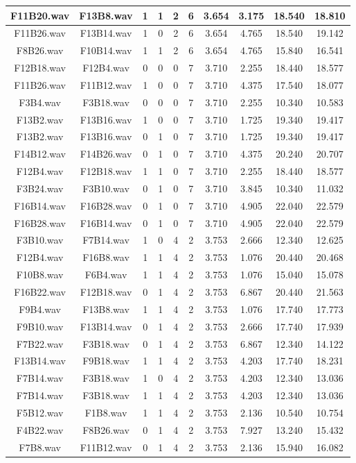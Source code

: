 \documentclass[11pt,a4paper]{book}
\begin{document}
\begin{longtable}[c]{|c|c|c|c|c|c|c|c|c|c|}
F11B20.wav&F13B8.wav&1&1&2&6&3.654&3.175&18.540&18.810\\ \hline
F11B26.wav&F13B14.wav&1&0&2&6&3.654&4.765&18.540&19.142\\ \hline
F8B26.wav&F10B14.wav&1&1&2&6&3.654&4.765&15.840&16.541\\ \hline
F12B18.wav&F12B4.wav&0&0&0&7&3.710&2.255&18.440&18.577\\ \hline
F11B26.wav&F11B12.wav&1&0&0&7&3.710&4.375&17.540&18.077\\ \hline
F3B4.wav&F3B18.wav&0&0&0&7&3.710&2.255&10.340&10.583\\ \hline
F13B2.wav&F13B16.wav&1&0&0&7&3.710&1.725&19.340&19.417\\ \hline
F13B2.wav&F13B16.wav&0&1&0&7&3.710&1.725&19.340&19.417\\ \hline
F14B12.wav&F14B26.wav&0&1&0&7&3.710&4.375&20.240&20.707\\ \hline
F12B4.wav&F12B18.wav&1&1&0&7&3.710&2.255&18.440&18.577\\ \hline
F3B24.wav&F3B10.wav&0&1&0&7&3.710&3.845&10.340&11.032\\ \hline
F16B14.wav&F16B28.wav&0&1&0&7&3.710&4.905&22.040&22.579\\ \hline
F16B28.wav&F16B14.wav&0&1&0&7&3.710&4.905&22.040&22.579\\ \hline
F3B10.wav&F7B14.wav&1&0&4&2&3.753&2.666&12.340&12.625\\ \hline
F12B4.wav&F16B8.wav&1&1&4&2&3.753&1.076&20.440&20.468\\ \hline
F10B8.wav&F6B4.wav&1&1&4&2&3.753&1.076&15.040&15.078\\ \hline
F16B22.wav&F12B18.wav&0&1&4&2&3.753&6.867&20.440&21.563\\ \hline
F9B4.wav&F13B8.wav&1&1&4&2&3.753&1.076&17.740&17.773\\ \hline
F9B10.wav&F13B14.wav&0&1&4&2&3.753&2.666&17.740&17.939\\ \hline
F7B22.wav&F3B18.wav&0&1&4&2&3.753&6.867&12.340&14.122\\ \hline
F13B14.wav&F9B18.wav&1&1&4&2&3.753&4.203&17.740&18.231\\ \hline
F7B14.wav&F3B18.wav&1&0&4&2&3.753&4.203&12.340&13.036\\ \hline
F7B14.wav&F3B18.wav&1&1&4&2&3.753&4.203&12.340&13.036\\ \hline
F5B12.wav&F1B8.wav&1&1&4&2&3.753&2.136&10.540&10.754\\ \hline
F4B22.wav&F8B26.wav&0&1&4&2&3.753&7.927&13.240&15.432\\ \hline
F7B8.wav&F11B12.wav&0&1&4&2&3.753&2.136&15.940&16.082\\ \hline

\end{longtable}
\end{document}
